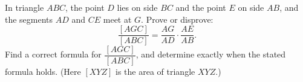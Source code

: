 In triangle $ABC$, the point $D$ lies on side $BC$ and the point $E$ on side $AB$, and the segments $AD$ and $CE$ meet at $G$. Prove or disprove:
\[\dfrac{[AGC]}{[ABC]}=\dfrac{AG}{AD}\cdot\dfrac{AE}{AB}.\]
Find a correct formula for $\dfrac{[AGC]}{[ABC]}$, and determine exactly when the stated formula holds. (Here $[XYZ]$ is the area of triangle $XYZ$.)
